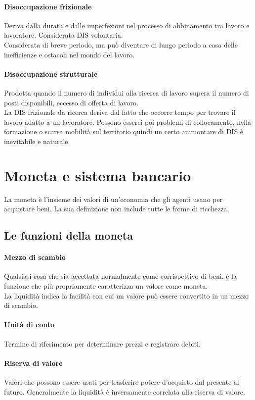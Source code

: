 \documentclass{report}
\begin{document}
	\paragraph{Disoccupazione frizionale} Deriva dalla durata e dalle imperfezioni nel processo di abbinamento tra lavoro e lavoratore. Considerata DIS volontaria.
	\medskip \\Considerata di breve periodo, ma può diventare di lungo periodo a casa delle inefficienze e ostacoli nel mondo del lavoro.
	\paragraph{Disoccupazione strutturale} Prodotta quando il numero di individui alla ricerca di lavoro supera il numero di posti disponibili, eccesso di offerta di lavoro.
	\medskip \\La DIS frizionale da ricerca deriva dal fatto che occorre tempo per trovare il lavoro adatto a un lavoratore. Possono esserci poi problemi di collocamento, nella formazione o scarsa mobilità sul territorio quindi un certo ammontare di DIS è inevitabile e naturale.
	\section{Moneta e sistema bancario}
	La moneta è l'insieme dei valori di un'economia che gli agenti usano per acquistare beni. La sua definizione non include tutte le forme di ricchezza.
	\subsection{Le funzioni della moneta}
	\paragraph{Mezzo di scambio} Qualsiasi cosa che sia accettata normalmente come corrispettivo di beni. è la funzione che più propriamente caratterizza un valore come moneta.
	\medskip \\La liquidità indica la facilità con cui un valore può essere convertito in un mezzo di scambio.
	\paragraph{Unità di conto} Termine di riferimento per determinare prezzi e registrare debiti.
	\paragraph{Riserva di valore} Valori che possono essere usati per trasferire potere d'acquisto dal presente al futuro. Generalmente la liquidità è inversamente correlata alla riserva di valore.
\end{document}
